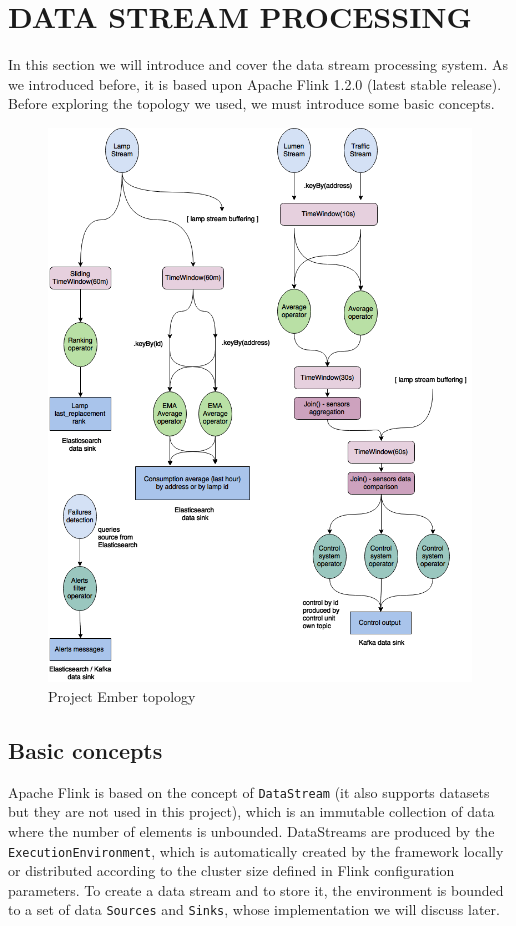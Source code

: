 \section{DATA STREAM PROCESSING}
In this section we will introduce and cover the data stream processing system. As we introduced before, it is based upon Apache Flink 1.2.0 (latest stable release). Before exploring the topology we used, we must introduce some basic concepts.

\begin{figure}
\begin{center}
	\includegraphics[scale=0.3]{img/ember_topology}
	\caption{Project Ember topology}
	\label{fig:ember_topology}
\end{center}
\end{figure}

\subsection{Basic concepts}
Apache Flink is based on the concept of \texttt{DataStream} (it also supports datasets but they are not used in this project), which is an immutable collection of data where the number of elements is unbounded. 
DataStreams are produced by the \texttt{ExecutionEnvironment}, which is automatically created by the framework locally or distributed according to the cluster size defined in Flink configuration parameters. To create a data stream and to store it, the environment is bounded to a set of data \texttt{Sources} and \texttt{Sinks}, whose implementation we will discuss later.

